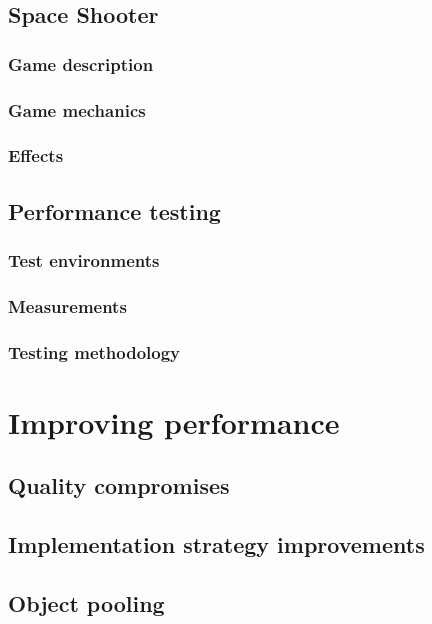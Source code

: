 \documentclass[sigconf]{acmart}
\begin{document}
\subsection{Space Shooter}

\subsubsection{Game description}

\subsubsection{Game mechanics}

\subsubsection{Effects}

\subsection{Performance testing}

\subsubsection{Test environments}

\subsubsection{Measurements}

\subsubsection{Testing methodology}

\section{Improving performance}

\subsection{Quality compromises}

\subsection{Implementation strategy improvements}

\subsection{Object pooling}

\end{document}
